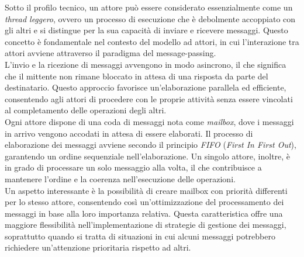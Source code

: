 Sotto il profilo tecnico, un attore può essere considerato essenzialmente come un \textit{thread leggero}, ovvero un processo di esecuzione che è debolmente accoppiato con gli altri e si distingue per la sua capacità di inviare e ricevere messaggi.
Questo concetto è fondamentale nel contesto del modello ad attori, in cui l'interazione tra attori avviene attraverso il paradigma del message-passing. \\
L'invio e la ricezione di messaggi avvengono in modo asincrono, il che significa che il mittente non rimane bloccato in attesa di una risposta da parte del destinatario.
Questo approccio favorisce un'elaborazione parallela ed efficiente, consentendo agli attori di procedere con le proprie attività senza essere vincolati al completamento delle operazioni degli altri. \\
Ogni attore dispone di una coda di messaggi nota come \textit{mailbox}, dove i messaggi in arrivo vengono accodati in attesa di essere elaborati.
Il processo di elaborazione dei messaggi avviene secondo il principio \textit{FIFO} (\textit{First In First Out}), garantendo un ordine sequenziale nell'elaborazione.
Un singolo attore, inoltre, è in grado di processare un solo messaggio alla volta, il che contribuisce a mantenere l'ordine e la coerenza nell'esecuzione delle operazioni. \\
Un aspetto interessante è la possibilità di creare mailbox con priorità differenti per lo stesso attore, consentendo così un'ottimizzazione del processamento dei messaggi in base alla loro importanza relativa.
Questa caratteristica offre una maggiore flessibilità nell'implementazione di strategie di gestione dei messaggi, soprattutto quando si tratta di situazioni in cui alcuni messaggi potrebbero richiedere un'attenzione prioritaria rispetto ad altri. \\

